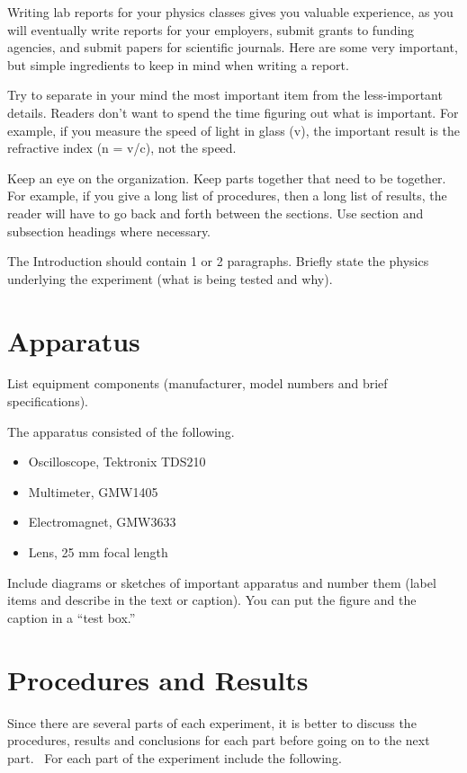\documentclass[aps,prl,reprint]{revtex4-2}
\begin{document}
Writing lab reports for your physics classes gives you valuable experience, as you will eventually write reports for your employers, submit grants to funding agencies, and submit papers for scientific journals. Here are some very important, but simple ingredients to keep in mind when writing a report.

Try to separate in your mind the most important item from the less-important details. Readers don’t want to spend the time figuring out what is important. For example, if you measure the speed of light in glass (v), the important result is the refractive index (n = v/c), not the speed.

Keep an eye on the organization. Keep parts together that need to be together. For example, if you give a long list of procedures, then a long list of results, the reader will have to go back and forth between the sections. Use section and subsection headings where necessary.

The Introduction should contain 1 or 2 paragraphs. Briefly state the physics underlying the experiment (what is being tested and why). 

\section{Apparatus}

List equipment components (manufacturer, model numbers and brief specifications). 

The apparatus consisted of the following.
\begin{itemize}
\item Oscilloscope, Tektronix TDS210 
\item Multimeter, GMW1405
\item Electromagnet, GMW3633
\item Lens, 25 mm focal length
\end{itemize}

Include diagrams or sketches of important apparatus and number them (label items and describe in the text or caption). You can put the figure and the caption in a ``test box.''

\section{Procedures and Results}

Since there are several parts of each experiment, it is better to discuss the procedures, results and conclusions for each part before going on to the next part.  For each part of the experiment include the following. 
\end{document}
